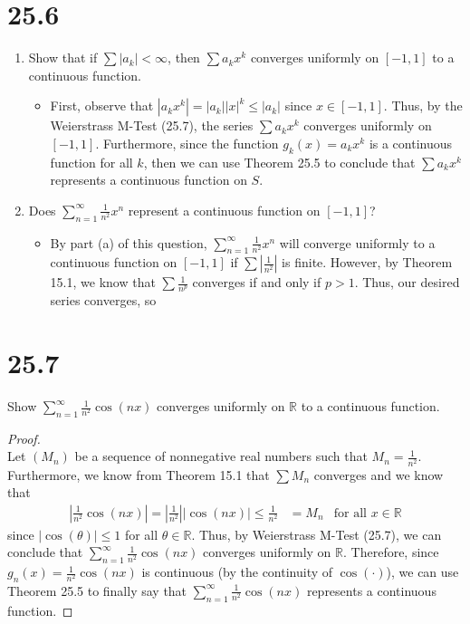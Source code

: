 \documentclass[10pt,a4paper]{article}
\theoremstyle{definition}
\begin{document}
\section*{25.6}
\begin{enumerate}[label = (\alph*)]
\item Show that if $\sum |a_k| < \infty$, then $\sum a_kx^k$ converges uniformly on $[-1,1]$ to a continuous function. 
	\begin{itemize}
	\item First, observe that $|a_kx^k| = |a_k||x|^k \leq |a_k|$ since $x \in [-1,1]$. Thus, by the Weierstrass M-Test (25.7), the series $\sum a_kx^k$ converges uniformly on $[-1,1]$. Furthermore, since the function $g_k(x) = a_kx^k$ is a continuous function for all $k$, then we can use Theorem 25.5 to conclude that $\sum a_kx^k$ represents a continuous function on $S$.
	\end{itemize}
\item Does $\displaystyle \sum_{n = 1}^{\infty} \frac{1}{n^2}x^n$ represent a continuous function on $[-1,1]$?
	\begin{itemize}
	\item By part (a) of this question, $\displaystyle \sum_{n = 1}^{\infty} \frac{1}{n^2}x^n$ will converge uniformly to a continuous function on $[-1,1]$ if $\displaystyle \sum \left|\frac{1}{n^2}\right|$ is finite. However, by Theorem 15.1, we know that $\displaystyle \sum \frac{1}{n^p}$ converges if and only if $p > 1$. Thus, our desired series converges, so 
	\end{itemize}
\end{enumerate}

\section*{25.7}
Show $\displaystyle \sum_{n = 1}^{\infty} \frac{1}{n^2}\cos(nx)$ converges uniformly on $\mathbb{R}$ to a continuous function. 

\begin{proof}{$ $}
\\Let $(M_n)$ be a sequence of nonnegative real numbers such that $M_n = \frac{1}{n^2}$. Furthermore, we know from Theorem 15.1 that $\sum M_n$ converges and we know that
\begin{align*}
\left|\frac{1}{n^2}\cos(nx)\right| = \left|\frac{1}{n^2}\right||\cos(nx)| \leq \frac{1}{n^2} &= M_n &\text{for all $x \in \mathbb{R}$}
\end{align*}
since $|\cos(\theta)| \leq 1$ for all $\theta \in \mathbb{R}$. Thus, by Weierstrass M-Test (25.7), we can conclude that $\displaystyle \sum_{n = 1}^{\infty} \frac{1}{n^2}\cos(nx)$ converges uniformly on $\mathbb{R}$. Therefore, since $g_n(x) = \frac{1}{n^2}\cos(nx)$ is continuous (by the continuity of $\cos(\cdot)$), we can use Theorem 25.5 to finally say that $\displaystyle \sum_{n = 1}^{\infty} \frac{1}{n^2}\cos(nx)$ represents a continuous function. 
\end{proof}
\end{document}
